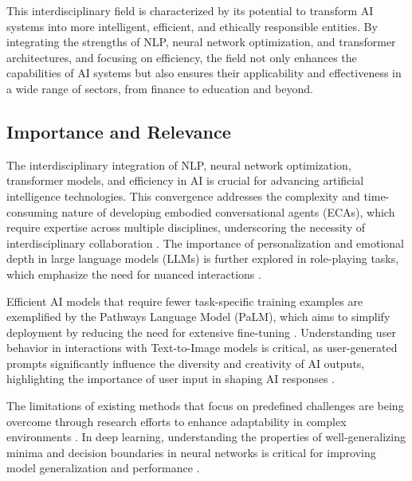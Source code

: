This interdisciplinary field is characterized by its potential to transform AI systems into more intelligent, efficient, and ethically responsible entities. By integrating the strengths of NLP, neural network optimization, and transformer architectures, and focusing on efficiency, the field not only enhances the capabilities of AI systems but also ensures their applicability and effectiveness in a wide range of sectors, from finance to education and beyond.



\subsection{Importance and Relevance} \label{subsec:Importance and Relevance}

The interdisciplinary integration of NLP, neural network optimization, transformer models, and efficiency in AI is crucial for advancing artificial intelligence technologies. This convergence addresses the complexity and time-consuming nature of developing embodied conversational agents (ECAs), which require expertise across multiple disciplines, underscoring the necessity of interdisciplinary collaboration \cite{korre2023takesvillagemultidisciplinaritycollaboration}. The importance of personalization and emotional depth in large language models (LLMs) is further explored in role-playing tasks, which emphasize the need for nuanced interactions \cite{tao2024rolecraftglmadvancingpersonalizedroleplaying}.



Efficient AI models that require fewer task-specific training examples are exemplified by the Pathways Language Model (PaLM), which aims to simplify deployment by reducing the need for extensive fine-tuning \cite{chowdhery2023palm}. Understanding user behavior in interactions with Text-to-Image models is critical, as user-generated prompts significantly influence the diversity and creativity of AI outputs, highlighting the importance of user input in shaping AI responses \cite{palmini2024patternscreativityuserinput}.



The limitations of existing methods that focus on predefined challenges are being overcome through research efforts to enhance adaptability in complex environments . In deep learning, understanding the properties of well-generalizing minima and decision boundaries in neural networks is critical for improving model generalization and performance \cite{sabanayagam2023unveilinghessiansconnectiondecision}.



